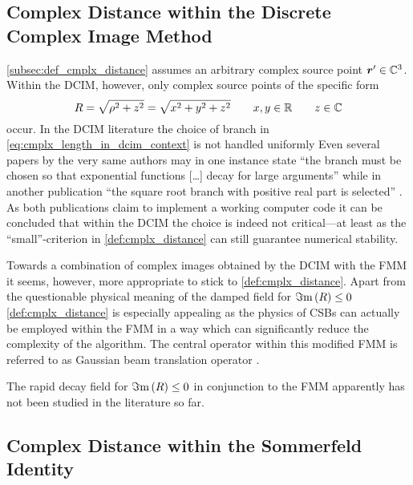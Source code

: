 \subsection{Complex Distance within the Discrete Complex Image Method}
\label{subsec:cmplx_distance_within_dcim}

\cref{subsec:def_cmplx_distance} assumes an arbitrary complex source point
$\rsrc \in \C^3$.
Within the \ac{DCIM}, however, only complex source points of the specific
form
\begin{equation}\label{eq:cmplx_length_in_dcim_context}
	R =
	\sqrt{\rho^2 + z^2}
	=
	\sqrt{x^2 + y^2 + z^2}
	\qquad
	x,y \in \mathbb{R} 
	\qquad
	z \in \mathbb{C}
\end{equation}
occur.
In the \ac{DCIM} literature the choice of branch in
\eqref{eq:cmplx_length_in_dcim_context} is not handled uniformly
Even several papers by the very same authors may in one instance state
\enquote{the branch must be chosen so that exponential functions [\dots\unkern]
decay for large arguments} \cite{Alparslan2010} while in another publication
\enquote{the square root branch with positive real part is selected}
\cite{Michalski2007a}.
As both publications claim to implement a working computer code it can be
concluded  that within the \ac{DCIM} the choice is indeed not
critical---at least as the \enquote{small}-criterion in
\cref{def:cmplx_distance} can still guarantee numerical stability.

Towards a combination of complex images obtained by the \ac{DCIM} with the
\ac{FMM} it seems, however, more appropriate to stick to
\cref{def:cmplx_distance}.
Apart from the questionable physical meaning of the damped field for 
$\Im\mathrm{m}\left(R\right) \leq 0$ \cref{def:cmplx_distance} is especially appealing as
the physics of \acp{CSB} can actually be employed within the \ac{FMM}
in a way which can significantly reduce the complexity of the algorithm.
The central operator within this modified \ac{FMM} is referred to as
Gaussian beam translation operator \cite{Hansen2013,eibert2021}.

The rapid decay field for $\Im\mathrm{m}\left(R\right) \leq 0$ in conjunction to the \ac{FMM}
apparently has not been studied in the literature so far.






\subsection{Complex Distance within the Sommerfeld Identity}

